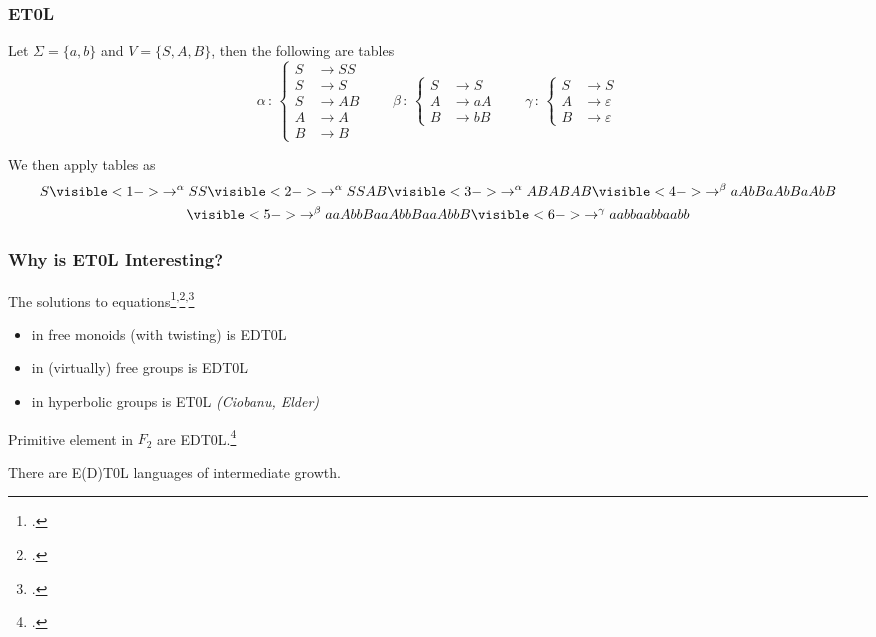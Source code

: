 \documentclass[11pt]{beamer}
\begin{document}
\begin{frame}
\frametitle{ET0L}

\begin{example}
	Let $\Sigma = \{a,b\}$ and $V = \{S,A,B\}$, then the following are tables
	\[
	\alpha \, : \,
	\left\{
	\begin{aligned}
	S &\to SS\\
	S &\to S\\
	S &\to AB\\
	A &\to A\\
	B &\to B
	\end{aligned}
	\right.
	\qquad
	\beta \, : \,
	\left\{
	\begin{aligned}
	S &\to S\\
	A &\to aA\\
	B &\to bB
	\end{aligned}
	\right.
	\qquad
	\gamma \, : \,
	\left\{
	\begin{aligned}
	S &\to S \\
	A &\to \varepsilon \\
	B &\to \varepsilon
	\end{aligned}
	\right.
	\]
\end{example}

We then apply tables as 
\begin{multline*}
	S
	\visible<1->{\to^\alpha SS}
	\visible<2->{\to^\alpha SS AB}
	\visible<3->{\to^\alpha AB AB AB}
	\visible<4->{\to^\beta  aA bB aA bB aA bB} \\
	\visible<5->{\to^\beta  aaA bbB aaA bbB aaA bbB}
	\visible<6->{\to^\gamma aa bb aa bb aa bb}
\end{multline*}


\end{frame}


\begin{frame}
\frametitle{Why is ET0L Interesting?}

The solutions to equations\footcite{ciobanu2016a}\textsuperscript{,}\footcite{diekert2016}\textsuperscript{,}\footcite{diekert2017}
\begin{itemize}
\item 
in free monoids (with twisting) is EDT0L

\item
in (virtually) free groups is EDT0L

\item
in hyperbolic groups is ET0L
\textit{(Ciobanu, Elder)}



\end{itemize}

\vspace*{1em}

Primitive element in $F_2$ are EDT0L.\footcite{ciobanu2018}

\vspace*{1em}

There are E(D)T0L languages of intermediate growth.

\end{frame}
\end{document}

